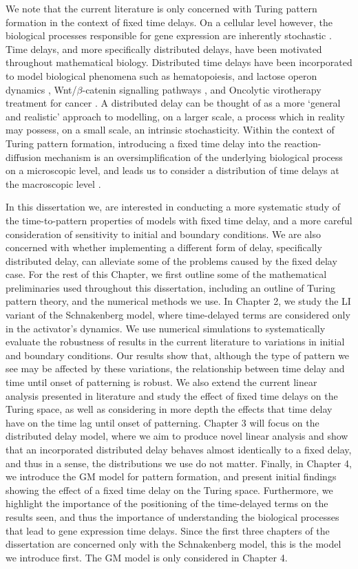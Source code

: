 We note that the current literature is only concerned with Turing pattern formation in the context of fixed time delays. On a cellular level however, the biological processes responsible for gene expression are inherently stochastic \cite{raj,elowitz,mcadams,paulsson}. Time delays, and more specifically distributed delays, have been motivated throughout mathematical biology. Distributed time delays have been incorporated to model biological phenomena such as hematopoiesis, and lactose operon dynamics \cite{newdist}, Wnt/$\beta$-catenin signalling pathways \cite{signal}, and Oncolytic virotherapy treatment for cancer \cite{cancer}. A distributed delay can be thought of as a more `general and realistic' \cite{cancer} approach to modelling, on a larger scale, a process which in reality may possess, on a small scale, an intrinsic stochasticity. Within the context of Turing pattern formation, introducing a fixed time delay into the reaction-diffusion mechanism is an oversimplification of the underlying biological process on a microscopic level, and leads us to consider a distribution of time delays at the macroscopic level \cite{bratsun,krausenew}.

In this dissertation we, are interested in conducting a more systematic study of the time-to-pattern properties of models with fixed time delay, and a more careful consideration of sensitivity to initial and boundary conditions. We are also concerned with whether implementing a different form of delay, specifically distributed delay, can alleviate some of the problems caused by the fixed delay case. For the rest of this Chapter, we first outline some of the mathematical preliminaries used throughout this dissertation, including an outline of Turing pattern theory, and the numerical methods we use. In Chapter 2, we study the LI variant of the Schnakenberg model, where time-delayed terms are considered only in the activator's dynamics. We use numerical simulations to systematically evaluate the robustness of results in the current literature to variations in initial and boundary conditions. Our results show that, although the type of pattern we see may be affected by these variations, the relationship between time delay and time until onset of patterning is robust. We also extend the current linear analysis presented in literature and study the effect of fixed time delays on the Turing space, as well as considering in more depth the effects that time delay have on the time lag until onset of patterning. Chapter 3 will focus on the distributed delay model, where we aim to produce novel linear analysis and show that an incorporated distributed delay behaves almost identically to a fixed delay, and thus in a sense, the distributions we use do not matter. Finally, in Chapter 4, we introduce the GM model for pattern formation, and present initial findings showing the effect of a fixed time delay on the Turing space. Furthermore, we highlight the importance of the positioning of the time-delayed terms on the results seen, and thus the importance of understanding the biological processes that lead to gene expression time delays. Since the first three chapters of the dissertation are concerned only with the Schnakenberg model, this is the model we introduce first. The GM model is only considered in Chapter 4.

